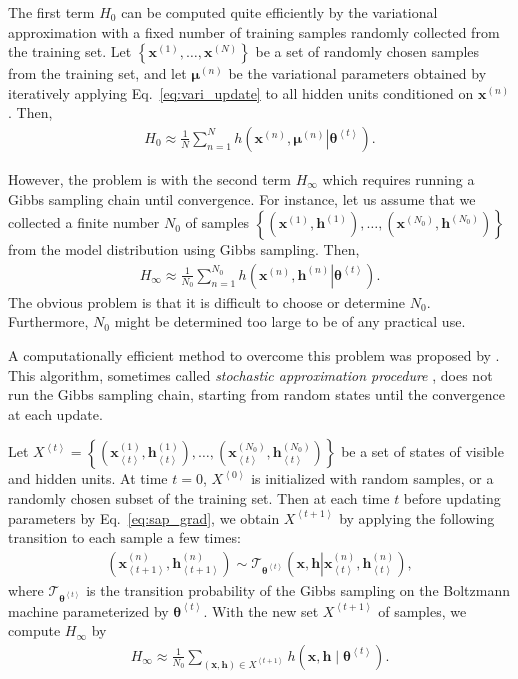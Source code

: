 \documentclass[dissertation,nocontribution,draft*]{aaltoseries}
\newcommand{\qt}[1]{\left<#1\right>}
\newcommand{\vect}[1]{\mathbf{#1}}
\newcommand{\vects}[1]{\boldsymbol{#1}}
\newcommand{\vh}[0]{\vect{h}}
\newcommand{\vx}[0]{\vect{x}}
\newcommand{\vmu}[0]{\vects{\mu}}
\newcommand{\TT}[0]{{\vects{\theta}}}
\newcommand{\T}[0]{\mathcal{T}}
\begin{document}
The first term $H_0$ can be computed quite efficiently by
the variational approximation with a fixed number of
training samples randomly collected from the training set.
Let $\left\{ \vx^{(1)}, \dots, \vx^{(N)} \right\}$ be a
set  of randomly chosen samples from the training set, and
let $\vmu^{(n)}$ be the variational parameters obtained by
iteratively applying Eq.~\eqref{eq:vari_update} to all
hidden units conditioned on $\vx^{(n)}$. Then, 
\begin{align*}
    H_0 \approx \frac{1}{N}\sum_{n=1}^{N} h\left(\left.\vx^{(n)}, \vmu^{(n)}
    \right| \TT^{\qt{t}}\right).
\end{align*}

However, the problem is with the second term $H_\infty$
which
requires running a Gibbs sampling chain until 
convergence. For instance, let us assume that we collected a
finite number $N_0$ of samples $\left\{ (\vx^{(1)},
\vh^{(1)}), \dots, (\vx^{(N_0)}, \vh^{(N_0)}) \right\}$ from
the model distribution using Gibbs sampling. Then, 
\begin{align*}
    H_\infty \approx \frac{1}{N_0} \sum_{n=1}^{N_0}
    h\left(\left.\vx^{(n)}, \vh^{(n)} \right| \TT^{\qt{t}}\right).
\end{align*}
The obvious problem is that it is difficult to choose or
determine $N_0$. Furthermore, $N_0$ might be determined too
large to be of any practical use.

A computationally efficient method to overcome this problem
was proposed by \citet{Younes1988}. This algorithm, sometimes
called \textit{stochastic approximation procedure}
\citep{Salakhutdinov2009}, does not run the Gibbs
sampling chain, starting from random states until the
convergence at each update.

Let $X^{\qt{t}} = \left\{ \left(\vx_{\qt{t}}^{(1)},
\vh_{\qt{t}}^{(1)}\right),
\dots, \left(\vx_{\qt{t}}^{(N_0)}, \vh_{\qt{t}}^{(N_0)}\right)\right\}$ be
a set of states of visible and hidden units. At time $t=0$,
$X^{\qt{0}}$ is initialized with random samples, or a randomly
chosen subset of the training set. Then at each time $t$ 
before updating parameters by
Eq.~\eqref{eq:sap_grad}, we obtain
$X^{\qt{t+1}}$ by applying the following transition to each
sample a few times:
\begin{align*}
    \left( \vx_{\qt{t+1}}^{(n)}, \vh_{\qt{t+1}}^{(n)}\right) \sim
    \T_{\TT^{\qt{t}}} \left(\vx, \vh \left| \vx_{\qt{t}}^{(n)},
    \vh_{\qt{t}}^{(n)}\right.\right),
\end{align*}
where $\T_{\TT^{\qt{t}}}$ is the transition probability of the
Gibbs sampling on the Boltzmann machine parameterized by
$\TT^{\qt{t}}$. With the new set $X^{\qt{t+1}}$ of samples, we compute
$H_\infty$ by
\begin{align*}
    H_\infty \approx \frac{1}{N_0} \sum_{(\vx, \vh) \in
    X^{\qt{t+1}}}
    h\left(\vx, \vh \mid \TT^{\qt{t}}\right).
\end{align*}
\end{document}

